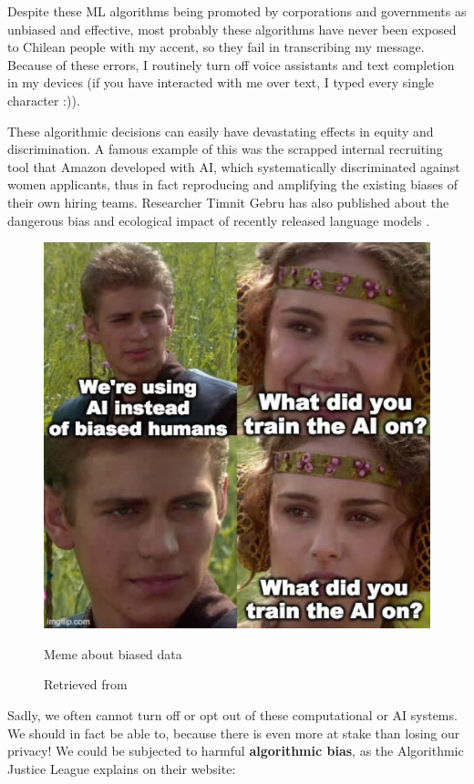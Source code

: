 Despite these \acrshort{ML} algorithms being promoted by corporations and governments as unbiased and effective, most probably these algorithms have never been exposed to Chilean people with my accent, so they fail in transcribing my message. Because of these errors, I routinely turn off voice assistants and text completion in my devices (if you have interacted with me over text, I typed every single character :)).

These algorithmic decisions can easily have devastating effects in equity and discrimination. A famous example of this was the scrapped internal recruiting tool that Amazon developed with \acrshort{AI}, which systematically discriminated against women applicants, thus in fact reproducing and amplifying the existing biases of their own hiring teams\cite{website-reuters-news-amazon-ai-bias}. Researcher Timnit Gebru has also published about the dangerous bias and ecological impact of recently released language models \cite{wired-timnit-gebru-google}.

\begin{figure}[ht]
  \centering
  \includegraphics[width=0.75\linewidth,height=0.40\textheight,keepaspectratio]{images/meme-star-wars.jpg}
  \caption{Meme about biased data}
  \caption*{Retrieved from \cite{website-twitter-janellecshane-meme}}
  \label{fig:meme-star-wars}
\end{figure}

Sadly, we often cannot turn off or opt out of these computational or \acrshort{AI} systems. We should in fact be able to, because there is even more at stake than losing our privacy! We could be subjected to harmful \textbf{algorithmic bias}, as the Algorithmic Justice League \cite{website-algorithmic-justice-league} explains on their website:

